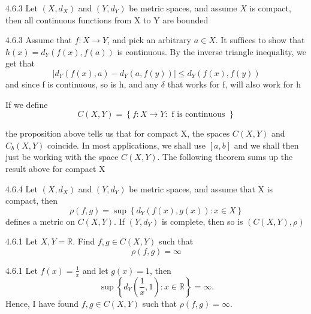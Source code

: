 \documentclass[a4paper,norsk]{article}
\renewcommand{\leq}{\leqslant}
\begin{document}
\begin{propositionbox}{4.6.3}{}
Let $ \left( X, d_X \right)  $ and $ \left( Y, d_Y \right)  $  be metric spaces, and assume $ X $ is compact, then all continuous functions from X to Y are bounded

\begin{proofbox}{4.6.3}{}
  Assume that $ f : X \to Y $, and pick an arbitrary $ a \in X $. It suffices to show that $ h(x) = d_Y \left( f(x), f(a) \right)  $ is continuous. By the inverse triangle inequality, we get that 
  \[
      \left| d_Y \left( f(x), a \right) - d_Y \left( a, f(y) \right)  \right| \leq d_Y \left( f(x), f(y) \right)  
  \]
  and since f is continuous, so is h, and any $ \delta $ that works for f, will also work for h 
    
\end{proofbox}
\end{propositionbox}
 

If we define
\[
    C \left( X,Y \right) = \left\{ f : X \to Y : \text{ f is continuous } \right\}  
\]

the proposition above tells us that for compact X, the spaces $ C \left( X, Y \right)  $ and $ C_b \left( X, Y \right)  $ coincide. In most applications, we shall use $ \left[ a, b \right]  $ and we shall then just be working with the space $ C \left( X, Y \right)  $. The following theorem sums up the result above for compact X

\begin{theorembox}{4.6.4}{}
Let $ \left( X, d_X \right)  $ and $ \left( Y, d_Y \right)  $ be metric spaces, and assume that X is compact, then
\[
    \rho \left( f, g \right) = \sup \left\{ d_Y \left( f(x), g(x) \right) : x \in X \right\} 
\]
defines a metric on $ C \left( X, Y \right)  $. If $ \left( Y, d_Y \right)  $ is complete, then so is $ \left( C \left( X, Y \right) , \rho \right)  $
  
\end{theorembox}


\begin{oppgavebox}{4.6.1}{}
Let $ X, Y = \mathbb{R} $. Find $ f, g \in C \left( X, Y \right)  $ such that
\[
    \rho \left( f, g \right) = \infty
\]

\begin{proofbox}{4.6.1}{}
  Let $ f(x) = \frac{ 1 }{ x } $ and let $ g(x) = 1 $, then 
  \[
      \sup \left\{ d_Y \left( \frac{ 1 }{ x }, 1   \right): x \in \mathbb{R}  \right\} = \infty.
  \]
  Hence, I have found $ f, g \in C \left( X, Y \right)  $ such that $ \rho \left( f, g \right) = \infty $.
\end{proofbox}
\end{oppgavebox}
\end{document}

